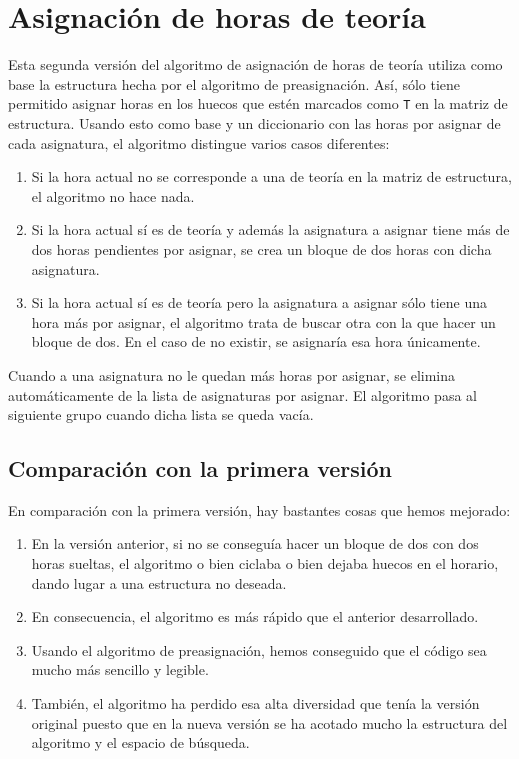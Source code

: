 \section{Asignación de horas de teoría}
Esta segunda versión del algoritmo de asignación de horas de teoría utiliza como base la estructura hecha por el algoritmo de preasignación. Así, sólo tiene permitido asignar horas en los huecos que estén marcados como \texttt{T} en la matriz de estructura. Usando esto como base y un diccionario con las horas por asignar de cada asignatura, el algoritmo distingue varios casos diferentes:

\begin{enumerate}[---]
  \item Si la hora actual no se corresponde a una de teoría en la matriz de estructura, el algoritmo no hace nada.
  \item Si la hora actual sí es de teoría y además la asignatura a asignar tiene más de dos horas pendientes por asignar, se crea un bloque de dos horas con dicha asignatura.
  \item Si la hora actual sí es de teoría pero la asignatura a asignar sólo tiene una hora más por asignar, el algoritmo trata de buscar otra con la que hacer un bloque de dos. En el caso de no existir, se asignaría esa hora únicamente.
\end{enumerate}

Cuando a una asignatura no le quedan más horas por asignar, se elimina automáticamente de la lista de asignaturas por asignar. El algoritmo pasa al siguiente grupo cuando dicha lista se queda vacía.

\subsection{Comparación con la primera versión}
En comparación con la primera versión, hay bastantes cosas que hemos mejorado:

\begin{enumerate}[$\bullet$]
  \item En la versión anterior, si no se conseguía hacer un bloque de dos con dos horas sueltas, el algoritmo o bien ciclaba o bien dejaba huecos en el horario, dando lugar a una estructura no deseada.
  \item En consecuencia, el algoritmo es más rápido que el anterior desarrollado.
  \item Usando el algoritmo de preasignación, hemos conseguido que el código sea mucho más sencillo y legible.
  \item También, el algoritmo ha perdido esa alta diversidad que tenía la versión original puesto que en la nueva versión se ha acotado mucho la estructura del algoritmo y el espacio de búsqueda.
\end{enumerate}

